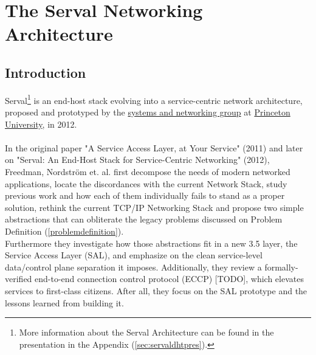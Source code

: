 \newpage
\section{The Serval Networking Architecture}
\subsection{Introduction}
Serval\footnote{More information about the Serval Architecture can be found in the presentation in the Appendix (\ref{sec:servaldhtpres}).} is an end-host stack evolving into a service-centric network architecture, proposed and prototyped by the \href{https://sns.cs.princeton.edu/}{systems and networking group} at \href{https://www.princeton.edu}{Princeton University}, in 2012.

\paragraph{} In the original paper "A Service Access Layer, at Your Service" (2011)\cite{Freedman2011} and later on "Serval: An End-Host Stack for Service-Centric Networking" (2012)\cite{Nordstrom2012}, Freedman, Nordstr{\"o}m et. al. first decompose the needs of modern networked applications, locate the discordances with the current Network Stack, study previous work and how each of them individually fails to stand as a proper solution, rethink the current TCP/IP Networking Stack and propose two simple abstractions that can obliterate the legacy problems discussed on Problem Definition (\ref{problemdefinition}).\\
\indent Furthermore they investigate how those abstractions fit in a new 3.5 layer, the Service Access Layer (SAL), and emphasize on the clean service-level data/control plane separation it imposes.
Additionally, they review a formally-verified end-to-end connection control protocol (ECCP)  [TODO], which elevates services to first-class citizens.
After all, they focus on the SAL prototype and the lessons learned from building it.

